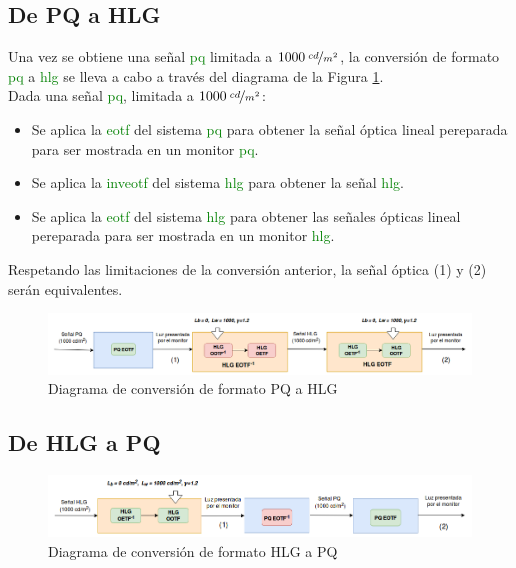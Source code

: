 \documentclass[a4paper, 12pt]{report}
\begin{document}
\subsection{De PQ a HLG}
\label{subsec:pq_a_hlg}
Una vez se obtiene una señal \textcolor{green}{pq} limitada a $1000\: \nicefrac{cd}{m^{2}}$, la conversión de formato \textcolor{green}{pq} a \textcolor{green}{hlg} se lleva a cabo a través del diagrama de la Figura \ref{fig:pq_to_hlg_diag}.\\
Dada una señal \textcolor{green}{pq}, limitada a $1000\: \nicefrac{cd}{m^{2}}$:
\begin{itemize}
    \item Se aplica la \textcolor{green}{eotf} del sistema \textcolor{green}{pq} para obtener la señal óptica lineal pereparada para ser mostrada en un monitor \textcolor{green}{pq}.
    \item Se aplica la \textcolor{green}{inveotf} del sistema \textcolor{green}{hlg} para obtener la señal \textcolor{green}{hlg}.
    \item  Se aplica la \textcolor{green}{eotf} del sistema \textcolor{green}{hlg} para obtener las señales ópticas lineal pereparada para ser mostrada en un monitor \textcolor{green}{hlg}.
\end{itemize}

Respetando las limitaciones de la conversión anterior, la señal óptica (1) y (2) serán equivalentes.

\begin{figure}[H]
    \centering
    \includegraphics[width=16cm, keepaspectratio]{img/4_Formatos_de_TV_HDR/4_6_Conversiones_entre_Formatos_HDR/4_6_1_de_PQ_a_HLG/1_pq2hlg.png}
    \caption{Diagrama de conversión de formato PQ a HLG}    
    \label{fig:pq_to_hlg_diag}
\end{figure}
\subsection{De HLG a PQ}
\label{subsec:hlg_a_pq}

\begin{figure}[H]
    \centering
    \includegraphics[width=16cm, keepaspectratio]{img/4_Formatos_de_TV_HDR/4_6_Conversiones_entre_Formatos_HDR/4_6_2_de_HLG_a_PQ/1_hlg2pq.png}
    \caption{Diagrama de conversión de formato HLG a PQ}
    \label{fig:hlg_to_pq_diag}
\end{figure}
\end{document}
